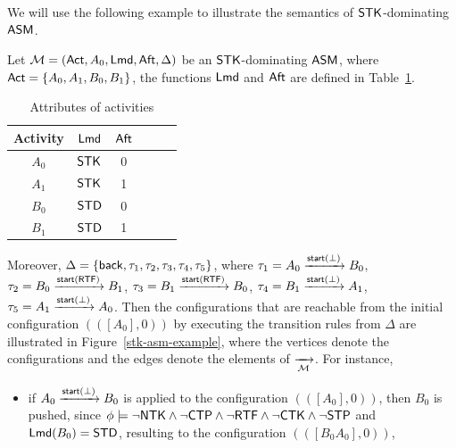 \begin{example}
	We will use the following example to illustrate the semantics of $\mathsf{STK}$-dominating $\textsf{ASM}$. 


Let ${\mathcal{M} }=({\sf Act},A_0,{\sf Lmd},{\sf Aft},\Delta)$ be an $\mathsf{STK}$-dominating $\textsf{ASM}$,  where ${\sf Act} = \{A_0, A_1,B_0,B_1\}$, the functions ${\sf Lmd}$ and ${\sf Aft}$ are defined in Table~\ref{tab-attribute-stk}.
\begin{table}[htbp]
	\begin{center}
	\begin{tabular}{|c|c|c|c|c|c|}
	\hline
	Activity & ${\sf Lmd}$ & ${\sf Aft}$\\
	\hline
	$A_0$ & $\mathsf{STK}$ & 0\\
	\hline
	$A_1$ & $\mathsf{STK}$ & 1 \\
	\hline
	$B_0$ & $\mathsf{STD}$ & 0 \\
	\hline
	$B_1$ & $\mathsf{STD}$ & 1 \\
	\hline
	\end{tabular}
	\caption{Attributes of activities}
	\label{tab-attribute-stk}
	\end{center}
\end{table} 

Moreover, $\Delta = \{{\mathsf{back} },\tau_1, \tau_2, \tau_3, \tau_4, \tau_5\}$, where
		$\tau_1 = A_0 \xrightarrow{{\mathsf{start} }(\bot)} B_0$,
		$\tau_2 = B_0 \xrightarrow{{\mathsf{start} }({\sf RTF})} B_1$,
		$\tau_3 = B_1 \xrightarrow{{\mathsf{start} }({\sf RTF})} B_0$,
		$\tau_4 = B_1 \xrightarrow{{\mathsf{start} }(\bot)} A_1$,
		$\tau_5 = A_1 \xrightarrow{{\mathsf{start} }(\bot)} A_0$.
	Then the configurations that are reachable from the initial configuration $(([A_0], 0))$ by executing the transition rules from $\Delta$ are illustrated in Figure~\ref{stk-asm-example}, where the vertices denote the configurations and the edges denote the elements of $\xrightarrow[{\mathcal{M} }]{}$. 
	For instance, 
	\begin{itemize}
	\item if $A_0 \xrightarrow{{\mathsf{start} }(\bot)} B_0$ is applied to the configuration $(([A_0],0))$, then $B_0$ is pushed, since $\phi\models\neg{\sf NTK}\wedge\neg{\sf CTP}\wedge\neg{\sf RTF}\wedge\neg{\sf CTK}\wedge\neg{\sf STP}$ and ${\sf Lmd}(B_0) = \mathsf{STD}$, resulting to the configuration $(([B_0A_0],0))$, %


\end{itemize}
\end{example}
